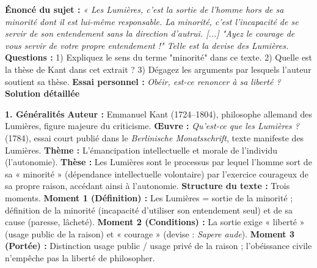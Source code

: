 \documentclass[11pt]{article}
\begin{document}
\begin{exoresolu}
\textbf{Énoncé du sujet :}
\textit{« Les Lumières, c'est la sortie de l'homme hors de sa minorité dont il est lui-même responsable. La minorité, c'est l'incapacité de se servir de son entendement sans la direction d'autrui. [...] "Ayez le courage de vous servir de votre propre entendement !" Telle est la devise des Lumières.} \\
\textbf{Questions :}
1) Expliquez le sens du terme "minorité" dans ce texte.
2) Quelle est la thèse de Kant dans cet extrait ?
3) Dégagez les arguments par lesquels l'auteur soutient sa thèse.
\textbf{Essai personnel :} \textit{Obéir, est-ce renoncer à sa liberté ?}
\tcblower
\textbf{Solution détaillée}

\textbf{1. Généralités}
\textbf{Auteur :} Emmanuel Kant (1724--1804), philosophe allemand des Lumières, figure majeure du criticisme.
\textbf{Œuvre :} \emph{Qu'est-ce que les Lumières ?} (1784), essai court publié dans le \emph{Berlinische Monatsschrift}, texte manifeste des Lumières.
\textbf{Thème :} L'émancipation intellectuelle et morale de l'individu (l'autonomie).
\textbf{Thèse :} Les Lumières sont le processus par lequel l'homme sort de sa « minorité » (dépendance intellectuelle volontaire) par l'exercice courageux de sa propre raison, accédant ainsi à l'autonomie.
\textbf{Structure du texte :} Trois moments. \textbf{Moment 1 (Définition) :} Les Lumières = sortie de la minorité ; définition de la minorité (incapacité d'utiliser son entendement seul) et de sa cause (paresse, lâcheté). \textbf{Moment 2 (Conditions) :} La sortie exige « liberté » (usage public de la raison) et « courage » (devise : \emph{Sapere aude}). \textbf{Moment 3 (Portée) :} Distinction usage public / usage privé de la raison ; l'obéissance civile n'empêche pas la liberté de philosopher.


\end{exoresolu}
\end{document}
